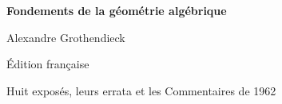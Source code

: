 \documentclass[11pt,twoside,openany,leqno]{book}
\begin{document}
\frontmatter
\begin{titlepage}
  \centering
  \vspace*{0.16\textheight}
  {\Huge\bfseries Fondements de la géométrie algébrique\par}
  \vspace{1.2\baselineskip}
  {\Large Alexandre Grothendieck\par}
  \vfill
  {\large Édition française\par}
  \vspace{0.5\baselineskip}
  {\normalsize Huit exposés, leurs errata et les Commentaires de 1962\par}
\end{titlepage}

\tableofcontents
\mainmatter

















\end{document}
